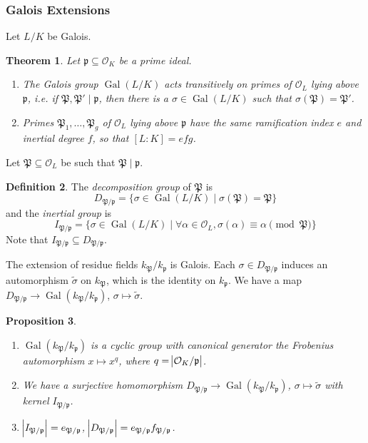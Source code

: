 \documentclass[11pt]{article}
\theoremstyle{definition}
\newtheorem{definition}{Definition}[section]
\theoremstyle{plain}
\newtheorem{theorem}[definition]{Theorem}
\newtheorem{proposition}[definition]{Proposition}
\theoremstyle{remark}
\DeclareMathOperator{\Gal}{Gal}
\newcommand{\cO}{\mathcal{O}}
\newcommand{\cp}{\mathfrak{P}}
\newcommand{\fp}{\mathfrak{p}}
\begin{document}
\subsubsection*{Galois Extensions}

Let $L/K$ be Galois.

\begin{theorem}\label{thm:1_2}
    Let $\fp \subseteq \cO_K$ be a prime ideal.
    \begin{enumerate}
        \item The Galois group $\Gal(L/K)$ acts transitively on primes of $\cO_L$ lying above $\fp$, i.e. if $\cp, \cp' \mid \fp$, then there is a $\sigma \in \Gal(L/K)$ such that $\sigma(\cp) = \cp'$.

        \item Primes $\cp_1, \ldots, \cp_g$ of $\cO_L$ lying above $\fp$ have the same ramification index $e$ and inertial degree $f$, so that $[L : K] = e f g$.
    \end{enumerate}
\end{theorem}

\noindent Let $\cp \subseteq \cO_L$ be such that $\cp \mid \fp$.

\begin{definition}\label{def:1_3}
    The \emph{decomposition group} of $\cp$ is
    \begin{equation*}
        D_{\cp / \fp} = \{\sigma \in \Gal(L/K) \mid \sigma(\cp) = \cp\}
    \end{equation*}
    and the \emph{inertial group} is
    \begin{equation*}
        I_{\cp / \fp} = \{\sigma \in \Gal(L/K) \mid \forall \alpha \in \cO_L, \sigma(\alpha) \equiv \alpha \pmod{\cp}\}
    \end{equation*}
    Note that $I_{\cp/\fp} \subseteq D_{\cp/\fp}$.
\end{definition}

The extension of residue fields $k_\cp / k_\fp$ is Galois. Each $\sigma \in D_{\cp / \fp}$ induces an automorphism $\widetilde{\sigma}$ on $k_\cp$, which is the identity on $k_\fp$. We have a map $D_{\cp / \fp} \to \Gal(k_\cp / k_\fp)$, $\sigma \mapsto \widetilde{\sigma}$.

\begin{proposition}\label{prop:1_4}\phantom{}
    \begin{enumerate}
        \item $\Gal(k_\cp / k_\fp)$ is a cyclic group with canonical generator the Frobenius automorphism $x \mapsto x^q$, where $q = \abs{\cO_K / \fp}$.

        \item We have a surjective homomorphism $D_{\cp / \fp} \to \Gal(k_\cp / k_\fp)$, $\sigma \mapsto \widetilde{\sigma}$ with kernel $I_{\cp / \fp}$.

        \item $\abs{I_{\cp / \fp}} = e_{\cp / \fp}$, $\abs{D_{\cp / \fp}} = e_{\cp / \fp} f_{\cp / \fp}$.
    \end{enumerate}
\end{proposition}
\end{document}
